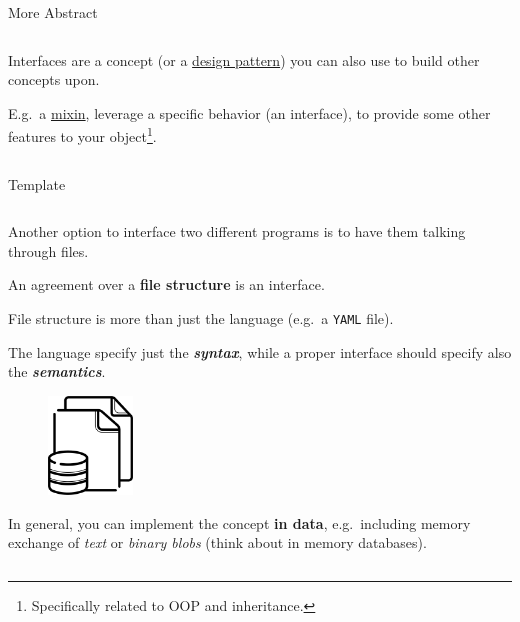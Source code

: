 \documentclass[9pt]{beamer}
\begin{document}
\begin{frame}[fragile]{More Abstract}
\begin{columns}
\begin{column}{0.5\textwidth}
            Interfaces are a concept (or a
            \href{https://refactoring.guru/design-patterns}{design pattern})
            you can also use to build other concepts upon.\newline

            E.g.\ a \href{https://en.wikipedia.org/wiki/Mixin}{mixin}, leverage
            a specific behavior (an interface), to provide some other features
            to your object\footnote{
                Specifically related to OOP and inheritance.
            }.
        \end{column}
    \end{columns}
\end{frame}

\begin{frame}{Template}
    \begin{columns}
        \begin{column}{0.5\textwidth}
            Another option to interface two different programs is to have them
            talking through files.\newline

            An agreement over a \textbf{file structure} is an interface.
            \begin{flushright}
                \footnotesize
                File structure is more than just the language (e.g.\ a
                \texttt{YAML} file).

                \hspace*{10em} The language specify just the
                \textbf{\textit{syntax}}, while a proper interface should
                specify also the \textbf{\textit{semantics}}.
            \end{flushright}

            \begin{figure}
                \centering
                \includegraphics[width=0.2\textwidth]{data-file}
            \end{figure}

            In general, you can implement the concept \alert{\textbf{in data}},
            e.g.\ including memory exchange of \textit{text} or \textit{binary
            blobs} (think about in memory databases).


\end{column}
\end{columns}
\end{frame}
\end{document}
